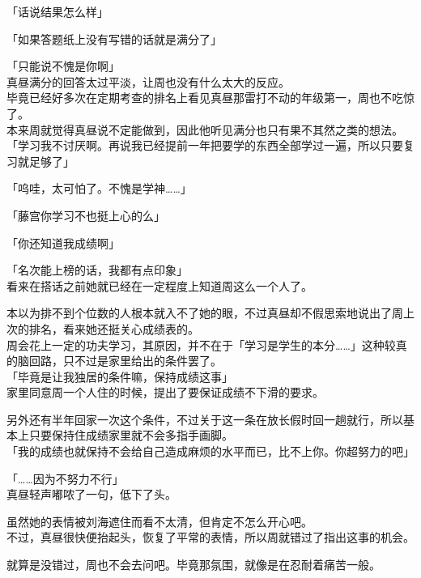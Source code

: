 「话说结果怎么样」

「如果答题纸上没有写错的话就是满分了」

「只能说不愧是你啊」\\

真昼满分的回答太过平淡，让周也没有什么太大的反应。\\

毕竟已经好多次在定期考查的排名上看见真昼那雷打不动的年级第一，周也不吃惊了。\\

本来周就觉得真昼说不定能做到，因此他听见满分也只有果不其然之类的想法。\\

「学习我不讨厌啊。再说我已经提前一年把要学的东西全部学过一遍，所以只要复习就足够了」

「呜哇，太可怕了。不愧是学神……」

「藤宫你学习不也挺上心的么」

「你还知道我成绩啊」

「名次能上榜的话，我都有点印象」\\

看来在搭话之前她就已经在一定程度上知道周这么一个人了。

本以为排不到个位数的人根本就入不了她的眼，不过真昼却不假思索地说出了周上次的排名，看来她还挺关心成绩表的。\\

周会花上一定的功夫学习，其原因，并不在于「学习是学生的本分……」这种较真的脑回路，只不过是家里给出的条件罢了。\\

「毕竟是让我独居的条件嘛，保持成绩这事」\\

家里同意周一个人住的时候，提出了要保证成绩不下滑的要求。

另外还有半年回家一次这个条件，不过关于这一条在放长假时回一趟就行，所以基本上只要保持住成绩家里就不会多指手画脚。\\

「我的成绩也就保持不会给自己造成麻烦的水平而已，比不上你。你超努力的吧」

「……因为不努力不行」\\

真昼轻声嘟哝了一句，低下了头。

虽然她的表情被刘海遮住而看不太清，但肯定不怎么开心吧。\\

不过，真昼很快便抬起头，恢复了平常的表情，所以周就错过了指出这事的机会。

就算是没错过，周也不会去问吧。毕竟那氛围，就像是在忍耐着痛苦一般。\\


